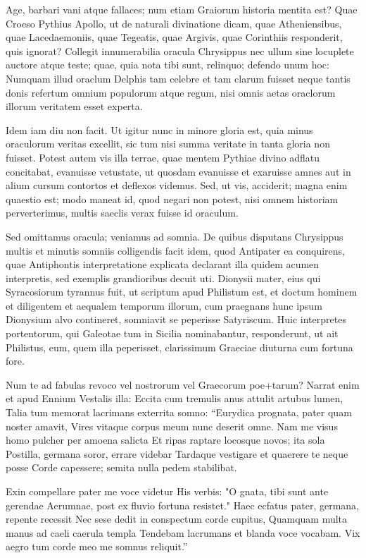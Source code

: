 Age, barbari vani atque fallaces; num etiam Graiorum historia mentita est? Quae Croeso Pythius Apollo, ut de naturali divinatione dicam, quae Atheniensibus, quae Lacedaemoniis, quae Tegeatis, quae Argivis, quae Corinthiis responderit, quis ignorat? Collegit innumerabilia oracula Chrysippus nec ullum sine locuplete auctore atque teste; quae, quia nota tibi sunt, relinquo; defendo unum hoc: Numquam illud oraclum Delphis tam celebre et tam clarum fuisset neque tantis donis refertum omnium populorum atque regum, nisi omnis aetas oraclorum illorum veritatem esset experta.

 Idem iam diu non facit. Ut igitur nunc in minore gloria est, quia minus oraculorum veritas excellit, sic tum nisi summa veritate in tanta gloria non fuisset. Potest autem vis illa terrae, quae mentem Pythiae divino adflatu concitabat, evanuisse vetustate, ut quosdam evanuisse et exaruisse amnes aut in alium cursum contortos et deflexos videmus. Sed, ut vis, acciderit; magna enim quaestio est; modo maneat id, quod negari non potest, nisi omnem historiam perverterimus, multis saeclis verax fuisse id oraculum.

 Sed omittamus oracula; veniamus ad somnia. De quibus disputans Chrysippus multis et minutis somniis colligendis facit idem, quod Antipater ea conquirens, quae Antiphontis interpretatione explicata declarant illa quidem acumen interpretis, sed exemplis grandioribus decuit uti. Dionysii mater, eius qui Syracosiorum tyrannus fuit, ut scriptum apud Philistum est, et doctum hominem et diligentem et aequalem temporum illorum, cum praegnans hunc ipsum Dionysium alvo contineret, somniavit se peperisse Satyriscum. Huic interpretes portentorum, qui Galeotae tum in Sicilia nominabantur, responderunt, ut ait Philistus, eum, quem illa peperisset, clarissimum Graeciae diuturna cum fortuna fore.

 Num te ad fabulas revoco vel nostrorum vel Graecorum poe+tarum? Narrat enim et apud Ennium Vestalis illa: Eccita cum tremulis anus attulit artubus lumen, Talia tum memorat lacrimans exterrita somno: ``Eurydica prognata, pater quam noster amavit, Vires vitaque corpus meum nunc deserit omne. Nam me visus homo pulcher per amoena salicta Et ripas raptare locosque novos; ita sola Postilla, germana soror, errare videbar Tardaque vestigare et quaerere te neque posse Corde capessere; semita nulla pedem stabilibat.

 Exin compellare pater me voce videtur His verbis: "O gnata, tibi sunt ante gerendae Aerumnae, post ex fluvio fortuna resistet." Haec ecfatus pater, germana, repente recessit Nec sese dedit in conspectum corde cupitus, Quamquam multa manus ad caeli caerula templa Tendebam lacrumans et blanda voce vocabam. Vix aegro tum corde meo me somnus reliquit.''

